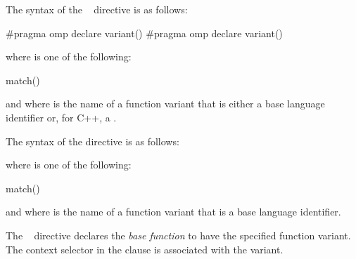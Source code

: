 \syntax
\begin{ccppspecific}
\begin{samepage}
The syntax of the ~ directive is as follows:

\begin{ompcPragma}
#pragma omp declare variant() 
\plc{[}#pragma omp declare variant() \plc{clause new-line]}
\plc{[ ... ]}
\end{ompcPragma}
\end{samepage}

\begin{samepage}
where  is one of the following{}:

\begin{indentedcodelist}
match()
\end{indentedcodelist}
\end{samepage}

and where  is the name of a function variant that is
either a base language identifier or, for C++, a .
\end{ccppspecific}

\begin{fortranspecific}
The syntax of the  directive is as follows:


where  is one of the following{}:

\begin{indentedcodelist}
match()
\end{indentedcodelist}

and where  is the name of a function variant that is
a base language identifier.
\end{fortranspecific}

\descr
The ~ directive declares the
\textit{base function} to have the specified function variant.
The context selector in the  clause is associated
with the variant.
\clearpage



